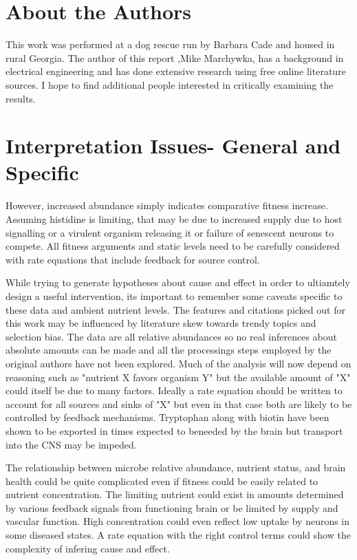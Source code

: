 \documentclass[aps,secnumarabic,balancelastpage,amsmath,amssymb,nofootinbib]{revtex4}
\begin{document}
\section{About the Authors}
This work was performed at a dog rescue run by Barbara Cade and
housed in rural Georgia.  The author of this report 
,Mike Marchywka,
has a background in electrical engineering and 
has done extensive research using free online literature sources.  
I hope to find additional people interested in critically 
examining the results.

\section{Interpretation Issues- General and Specific }
\label{appendix:interp}


However, increased abundance simply indicates comparative fitness
increase. Assuming histidine is limiting, that may be due to
increased supply due to host signalling or a virulent
organism releasing it or failure of senescent neurons to 
compete. All fitness arguments and static levels need to
be carefully considered with rate equations that include
feedback for source control.  

While trying to generate hypotheses about cause and effect
in order to ultiamtely design a useful intervention, its
important to remember some caveats specific to these data
and ambient nutrient levels. 
The features and citations picked out for this work may be
influenced by literature skew towards trendy topics and
selection bias. 
The data are all relative
abundances so no real inferences about absolute
amounts can be made and all the processings
steps employed by the original authors have not been
explored. Much of the analysis will now depend
on reasoning such as "nutrient X favors organism Y"
but the available amount of "X" could itself be
due to many factors. Ideally a rate equation
should be written to account for all sources and sinks
of "X" but even in that case both are likely to be
controlled by feedback mechanisms. Tryptophan along
with biotin have been shown to be exported in
times expected to beneeded by the brain but
transport into the CNS may be impeded. 



The relationship between microbe relative abundance,
nutrient status, and brain health could be quite complicated
even if fitness could be easily related to nutrient
concentration. The limiting nutrient could exist
in amounts determined by various feedback signals
from functioning brain or be limited by supply and
vascular function. High concentration could even reflect
low uptake by neurons in some diseased states. A rate
equation with the right control terms could show the complexity
of infering cause and effect. 
\end{document}
